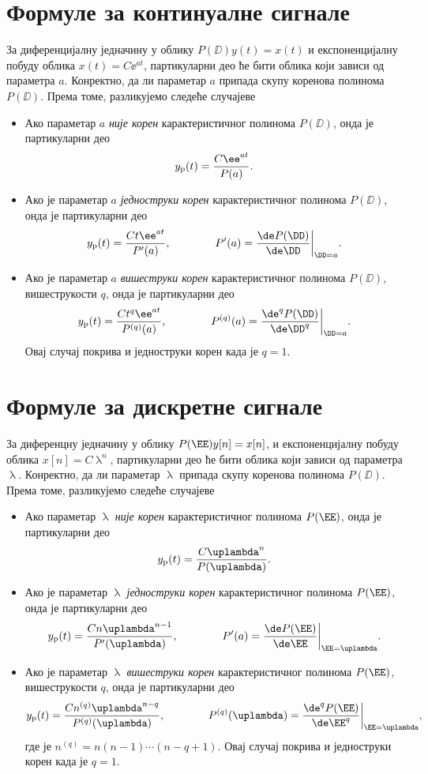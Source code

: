 \section*{Формуле за континуалне сигнале}

За диференцијалну једначину у облику $P(\DD) y(t) = x(t)$ и експоненцијалну побуду облика 
$x(t) = C \ee^{at}$, партикуларни део ће бити облика који зависи од параметра $a$. Конректно, да ли параметар $a$ припада скупу 
коренова полинома $P(\DD)$. Према томе, разликујемо следеће случајеве
\begin{itemize}
    \item Ако параметар $a$ \emph{није корен} карактеристичног полинома $P(\DD)$, онда је партикуларни део 
    $$
        y_{\rm p}(t) = \dfrac{C\ee^{at}}{P(a)}.
    $$
    \item Ако је параметар $a$ \emph{једноструки корен} карактеристичног полинома $P(\DD)$, онда је партикуларни део 
    $$
        y_{\rm p}(t) = \dfrac{Ct\ee^{at}}{P'(a)}, \qquad\qquad P'(a) = \dfrac{\de P(\DD)}{\de \DD}\bigg\vert_{\DD = a}.
    $$
    \item Ако је параметар $a$ \emph{вишеструки корен} карактеристичног полинома $P(\DD)$, вишеструкости $q$, онда је партикуларни део 
    $$
    y_{\rm p}(t) = \dfrac{Ct^q\ee^{at}}{P^{(q)}(a)}, \qquad\qquad P^{(q)}(a) = \dfrac{\de^q P(\DD)}{\de \DD^q}\bigg\vert_{\DD = a}.
    $$
    Овај случај покрива и једноструки корен када је $q = 1$.
\end{itemize} 

\section*{Формуле за дискретне сигнале}

За диференцну једначину у облику $P(\EE) y[n] = x[n]$, и експоненцијалну побуду облика 
$x[n] = C\uplambda^{n}$, партикуларни део ће бити облика који зависи од параметра $\uplambda$. Конректно, да ли параметар $\uplambda$ припада скупу 
коренова полинома $P(\DD)$. Према томе, разликујемо следеће случајеве
\begin{itemize}
    \item Ако параметар $\uplambda$ \emph{није корен} карактеристичног полинома $P(\EE)$, онда је партикуларни део 
    $$
        y_{\rm p}(t) = \dfrac{C \uplambda^n }{P(\uplambda)}.
    $$
    \item Ако је параметар $\uplambda$ \emph{једноструки корен} карактеристичног полинома $P(\EE)$, онда је партикуларни део 
    $$
        y_{\rm p}(t) = \dfrac{C n \uplambda^{n-1} }{P'(\uplambda)}, \qquad\qquad P'(a) = \dfrac{\de P(\EE)}{\de \EE}\bigg\vert_{\EE = \uplambda}.
    $$
    \item Ако је параметар $\uplambda$ \emph{вишеструки корен} карактеристичног полинома $P(\EE)$, вишеструкости $q$, онда је партикуларни део 
    $$
    y_{\rm p}(t) = \dfrac{Cn^{(q)}\uplambda^{n - q} }{P^{(q)}(\uplambda)}, \qquad\qquad P^{(q)}(\uplambda) = \dfrac{\de^q P(\EE)}{\de \EE^q}\bigg\vert_{\EE = \uplambda},
    $$
    где је $n^{(q)} = n(n-1)\cdots(n-q+1)$. Овај случај покрива и једноструки корен када је $q = 1$.
\end{itemize} 
